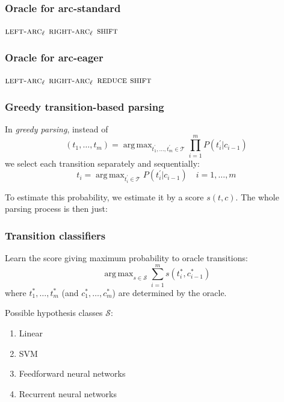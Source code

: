 \documentclass[t]{beamer}
\DeclareMathOperator*{\argmax}{arg\,max}
\begin{document}
\begin{frame}
    \frametitle{Oracle for arc-standard}
    \begin{algorithmic}[0]
            \RETURN $\textsc{left-arc}_\ell$
            \RETURN $\textsc{right-arc}_\ell$
        \ELSE
            \RETURN $\textsc{shift}$
        \ENDIF
    \ENDWHILE
    \end{algorithmic}
\end{frame}

\begin{frame}
    \frametitle{Oracle for arc-eager}
    \begin{algorithmic}[0]
            \RETURN $\textsc{left-arc}_\ell$
            \RETURN $\textsc{right-arc}_\ell$
            \RETURN $\textsc{reduce}$
        \ELSE
            \RETURN $\textsc{shift}$
        \ENDIF
    \ENDWHILE
    \end{algorithmic}
\end{frame}

\begin{frame}
    \frametitle{Greedy transition-based parsing}
    In \textit{greedy parsing}, instead of    
    \[
    (t_1,\ldots,t_m)=\argmax_{t^\prime_1,\ldots,t^\prime_m \in \mathcal{T}} \prod_{i=1}^mP(t^\prime_i|c_{i-1})
    \]
    we select each transition separately and sequentially:
    \[
    t_i = \argmax_{t^\prime_i \in \mathcal{T}} P(t^\prime_i|c_{i-1}) \quad i=1,\ldots,m
    \]
    
    \pause\vfill
    
    To estimate this probability, we estimate it by a score $s(t, c)$.
    The whole parsing process is then just:
    \begin{algorithmic}[0]
        \STATE{$c\leftarrow\Big(\argmax_{t\in\mathcal{T}}s(t,c)\Big)(c)$}
    \ENDWHILE
    \end{algorithmic}
\end{frame}

\begin{frame}
    \frametitle{Transition classifiers}
    Learn the score giving maximum probability to oracle transitions:
    \[
    \argmax_{s\in\mathcal{S}}\sum_{i=1}^ms(t^*_i,c^*_{i-1})
    \]
    where $t^*_1,\ldots,t^*_m$ (and $c^*_1,\ldots,c^*_m$) are determined by the oracle.
    
    \pause\vfill
    
    Possible hypothesis classes $\mathcal{S}$:
    \begin{enumerate}
    \item Linear
    \item SVM
    \item Feedforward neural networks
    \item Recurrent neural networks
    \end{enumerate}
\end{frame}
\end{document}
